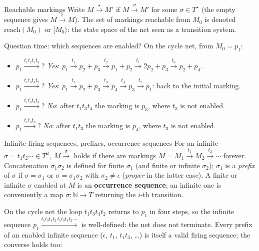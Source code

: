 \begin{definitionbox}{Reachable markings}
Write $M \xrightarrow{\star} M'$ if $M \xrightarrow{\sigma} M'$ for some $\sigma \in T^\star$ (the empty sequence gives $M \xrightarrow{\epsilon} M$). The set of markings reachable from $M_0$ is denoted $\mathrm{reach}(M_0)$ or $[M_0\rangle$: the state space of the net seen as a transition system.
\end{definitionbox}

\begin{examplebox}{Question time: which sequences are enabled?}
On the cycle net, from $M_0 = p_1$:
\begin{itemize}
  \item $p_1 \xrightarrow{t_1 t_2 t_1 t_3}$? \emph{Yes}: $p_1 \xrightarrow{t_1} p_2 + p_3 \xrightarrow{t_2} p_1 + p_2 \xrightarrow{t_1} 2p_2 + p_3 \xrightarrow{t_3} p_2 + p_4$.
  \item $p_1 \xrightarrow{t_1 t_3 t_4 t_2}$? \emph{Yes}: $p_1 \xrightarrow{t_1} p_2 + p_3 \xrightarrow{t_3} p_4 \xrightarrow{t_4} p_3 \xrightarrow{t_2} p_1$: back to the initial marking.
  \item $p_1 \xrightarrow{t_1 t_3 t_4 t_3}$? \emph{No}: after $t_1 t_3 t_4$ the marking is $p_3$, where $t_3$ is not enabled.
  \item $p_1 \xrightarrow{t_1 t_3 t_3}$? \emph{No}: after $t_1 t_3$ the marking is $p_4$, where $t_3$ is not enabled.
\end{itemize}
\end{examplebox}

\begin{definitionbox}{Infinite firing sequences, prefixes, occurrence sequences}
For an infinite $\sigma = t_1 t_2 \cdots \in T^\omega$, $M \xrightarrow{\sigma}$ holds if there are markings $M = M_1 \xrightarrow{t_1} M_2 \xrightarrow{t_2} \cdots$ forever. Concatenation $\sigma_1 \sigma_2$ is defined for finite $\sigma_1$ (and finite or infinite $\sigma_2$); $\sigma_1$ is a \emph{prefix} of $\sigma$ if $\sigma = \sigma_1$ or $\sigma = \sigma_1 \sigma_2$ with $\sigma_2 \neq \epsilon$ (\emph{proper} in the latter case). A finite or infinite $\sigma$ enabled at $M$ is an \textbf{occurrence sequence}; an infinite one is conveniently a map $\sigma : \mathbb{N} \to T$ returning the $i$-th transition.
\end{definitionbox}

On the cycle net the loop $t_1 t_3 t_4 t_2$ returns to $p_1$ in four steps, so the infinite sequence $p_1 \xrightarrow{t_1 t_3 t_4 t_2\, t_1 t_3 t_4 t_2\, \cdots}$ is well-defined: the net does not terminate. Every prefix of an enabled infinite sequence ($\epsilon$, $t_1$, $t_1 t_3$, \dots) is itself a valid firing sequence; the converse holds too:

